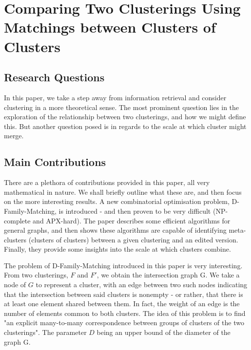 \documentclass[sigconf,authorversion,nonacm]{acmart}
\begin{document}
\section{Comparing Two Clusterings Using Matchings between Clusters of Clusters} \subsection{Research Questions} In this
paper, we take a step away from information retrieval and consider clustering in a more theoretical sense. The most
prominent question lies in the exploration of the relationship between two clusterings, and how we might define this.
But another question posed is in regards to the scale at which cluster might merge. \subsection{Main Contributions}
There are a plethora of contributions provided in this paper, all very mathematical in nature. We shall briefly outline
what these are, and then focus on the more interesting results. A new combinatorial optimisation problem,
D-Family-Matching, is introduced - and then proven to be very difficult (NP-complete and APX-hard). The paper describes
some efficient algorithms for general graphs, and then shows these algorithms are capable of identifying meta-clusters
(clusters of clusters) between a given clustering and an edited version. Finally, they provide some insights into the
scale at which clusters combine.

The problem of D-Family-Matching introduced in this paper is very interesting. From two clusterings, $F$ and $F'$, we
obtain the intersection graph G. We take a node of $G$ to represent a cluster, with an edge between two such nodes
indicating that the intersection between said clusters is nonempty - or rather, that there is at least one element
shared between them. In fact, the weight of an edge is the number of elements common to both clusters. The idea of this
problem is to find "an explicit many-to-many correspondence between groups of clusters of the two
clusterings"\cite{Cazals2019}. The parameter $D$ being an upper bound of the diameter of the graph G.
\end{document}
